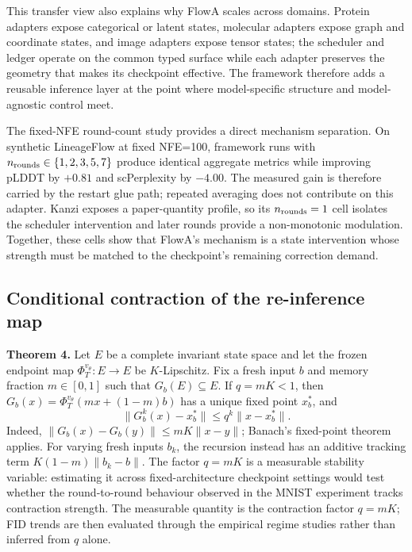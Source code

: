 \documentclass[journal,twocolumn,final]{IEEEtran}
\begin{document}
This transfer view also explains why FlowA scales across domains. Protein adapters expose categorical or latent states, molecular adapters expose graph and coordinate states, and image adapters expose tensor states; the scheduler and ledger operate on the common typed surface while each adapter preserves the geometry that makes its checkpoint effective. The framework therefore adds a reusable inference layer at the point where model-specific structure and model-agnostic control meet.

The fixed-NFE round-count study provides a direct mechanism separation. On synthetic LineageFlow at fixed NFE=100, framework runs with $n_{\rm rounds}\in\{1,2,3,5,7\}$ produce identical aggregate metrics while improving pLDDT by $+0.81$ and scPerplexity by $-4.00$. The measured gain is therefore carried by the restart glue path; repeated averaging does not contribute on this adapter. Kanzi exposes a paper-quantity profile, so its $n_{\rm rounds}=1$ cell isolates the scheduler intervention and later rounds provide a non-monotonic modulation. Together, these cells show that FlowA's mechanism is a state intervention whose strength must be matched to the checkpoint's remaining correction demand.

\subsection{Conditional contraction of the re-inference map}
\textbf{Theorem 4.} Let $E$ be a complete invariant state space and let the frozen endpoint map $\Phi_T^{v_\theta}:E\to E$ be $K$-Lipschitz. Fix a fresh input $b$ and memory fraction $m\in[0,1]$ such that $G_b(E)\subseteq E$. If $q=mK<1$, then $G_b(x)=\Phi_T^{v_\theta}(mx+(1-m)b)$ has a unique fixed point $x_b^*$, and
\begin{equation}
\|G_b^k(x)-x_b^*\|\le q^k\|x-x_b^*\|.
\end{equation}
Indeed, $\|G_b(x)-G_b(y)\|\le mK\|x-y\|$; Banach's fixed-point theorem applies. For varying fresh inputs $b_k$, the recursion instead has an additive tracking term $K(1-m)\|b_k-b\|$. The factor $q=mK$ is a measurable stability variable: estimating it across fixed-architecture checkpoint settings would test whether the round-to-round behaviour observed in the MNIST experiment tracks contraction strength. The measurable quantity is the contraction factor $q=mK$; FID trends are then evaluated through the empirical regime studies rather than inferred from $q$ alone.
\end{document}
